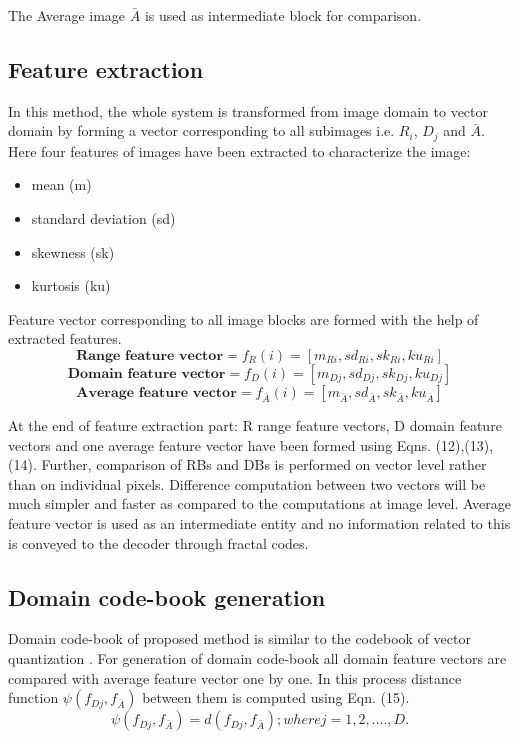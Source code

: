 \documentclass[10pt,a4paper,journal]{IEEEtran}
\begin{document}
The Average image $\bar{A}$ is used as intermediate block for comparison.
\subsection{Feature extraction}
\hspace*{2em} In this method, the whole system is transformed from image domain to vector domain by forming a vector corresponding to
all subimages\cite{13} i.e. $R_{i}$, $D_{j}$ and $\bar{A}$. Here four features of images have
been extracted to characterize the image:
\begin{itemize}
\item mean (m)
\item  standard deviation (sd)
\item skewness (sk) 
\item kurtosis (ku)
\end{itemize}  
\hspace*{2em} Feature vector corresponding
to all image blocks are formed with the help of
extracted features.\\
\begin{equation}
\textbf{Range feature vector} =  f_{R}(i) =  \left [ m_{Ri}, sd_{Ri}, sk_{Ri}, ku_{Ri} \right ]
\end{equation}
\begin{equation}
\textbf{Domain feature vector} =  f_{D}(i) =  \left [ m_{Dj}, sd_{Dj}, sk_{Dj}, ku_{Dj} \right ] 
\end{equation}
\begin{equation}
\textbf{Average feature vector} =  f_{\bar{A}}(i) = \left [ m_{\bar{A}}, sd_{\bar{A}}, sk_{\bar{A}}, ku_{\bar{A}} \right ] 
\end{equation}

\hspace*{2em} At the end of feature extraction part: R range feature vectors, D domain feature vectors and one average feature vector have been formed using Eqns. (12),(13),(14)\cite{13}. Further, comparison of RBs and DBs is performed on vector level rather than on individual pixels. Difference computation
between two vectors will be much simpler and faster as compared to the computations at image level. Average feature vector is used as an intermediate entity and no information related to this is conveyed to the decoder through fractal codes.
\subsection{Domain code-book generation}
\hspace*{2em} Domain code-book\cite{14} of proposed method is similar to the codebook of vector quantization \cite{13}. For generation of domain code-book all domain feature vectors are compared with average feature vector one by one. In this process distance function $\psi(f_{Dj},f_{\bar{A}})$ between them is computed using Eqn. (15)\cite{13}.
\begin{equation}
\psi(f_{Dj},f_{\bar{A}}) = d(f_{Dj},f_{\bar{A}}) ; where j = 1,2,...., D.
\end{equation}
\end{document}
